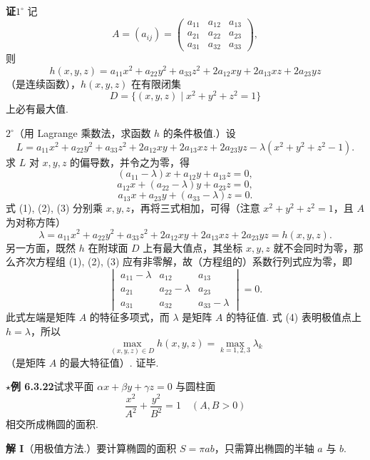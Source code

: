 \documentclass[UTF8,12pt,a4paper,fontset=fandol]{ctexart}
\begin{document}
\noindent\textbf{证}\quad $1^\circ$ 记
\[
  A=(a_{ij})=
  \begin{pmatrix}
    a_{11}&a_{12}&a_{13}\\
    a_{21}&a_{22}&a_{23}\\
    a_{31}&a_{32}&a_{33}
  \end{pmatrix},
\]
则
\[
  h(x,y,z)=a_{11}x^2+a_{22}y^2+a_{33}z^2
  +2a_{12}xy+2a_{13}xz+2a_{23}yz
\]
（是连续函数），$h(x,y,z)$ 在有限闭集
\[
  D=\{(x,y,z)\mid x^2+y^2+z^2=1\}
\]
上必有最大值.

$2^\circ$（用 Lagrange 乘数法，求函数 $h$ 的条件极值.）设
\[
  L=a_{11}x^2+a_{22}y^2+a_{33}z^2+2a_{12}xy+2a_{13}xz+2a_{23}yz
  -\lambda(x^2+y^2+z^2-1).
\]
求 $L$ 对 $x,y,z$ 的偏导数，并令之为零，得
\[
  (a_{11}-\lambda)x+a_{12}y+a_{13}z=0, \tag{1}
\]
\[
  a_{12}x+(a_{22}-\lambda)y+a_{23}z=0, \tag{2}
\]
\[
  a_{13}x+a_{23}y+(a_{33}-\lambda)z=0. \tag{3}
\]
式 (1), (2), (3) 分别乘 $x,y,z$，再将三式相加，可得（注意 $x^2+y^2+z^2=1$，且 $A$ 为对称方阵）
\[
  \lambda=a_{11}x^2+a_{22}y^2+a_{33}z^2
  +2a_{12}xy+2a_{13}xz+2a_{23}yz=h(x,y,z). \tag{4}
\]
另一方面，既然 $h$ 在附球面 $D$ 上有最大值点，其坐标 $x,y,z$ 就不会同时为零，那么齐次方程组 (1), (2), (3) 应有非零解，故（方程组的）系数行列式应为零，即
\[
  \begin{vmatrix}
    a_{11}-\lambda&a_{12}&a_{13}\\
    a_{21}&a_{22}-\lambda&a_{23}\\
    a_{31}&a_{32}&a_{33}-\lambda
  \end{vmatrix}=0. \tag{5}
\]
此式左端是矩阵 $A$ 的特征多项式，而 $\lambda$ 是矩阵 $A$ 的特征值. 式 (4) 表明极值点上 $h=\lambda$，所以
\[
  \max_{(x,y,z)\in D}h(x,y,z)=\max_{k=1,2,3}\lambda_k
\]
（是矩阵 $A$ 的最大特征值）. 证毕.

\noindent\textbf{\ensuremath{\star}例 6.3.22}\quad 试求平面 $\alpha x+\beta y+\gamma z=0$ 与圆柱面
\[
  \frac{x^2}{A^2}+\frac{y^2}{B^2}=1\quad(A,B>0)
\]
相交所成椭圆的面积.

\noindent\textbf{解 I}\quad （用极值方法.）要计算椭圆的面积 $S=\pi ab$，只需算出椭圆的半轴 $a$ 与 $b$.
\end{document}
